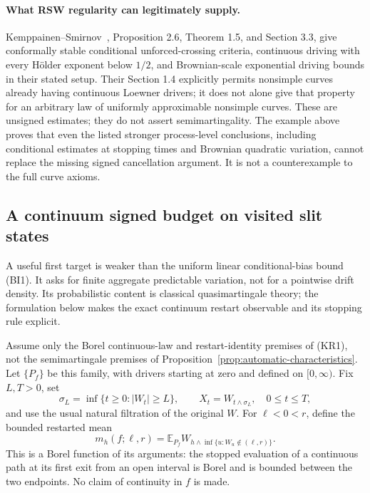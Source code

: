 \documentclass[11pt]{article}
\theoremstyle{definition}\newtheorem{definition}[theorem]{Definition}
\theoremstyle{remark}\newtheorem{remark}[theorem]{Remark}
\begin{document}
\paragraph{What RSW regularity can legitimately supply.}
Kemppainen--Smirnov~\cite{ks}, Proposition 2.6, Theorem 1.5,
and Section 3.3, give conformally stable conditional unforced-crossing
criteria, continuous driving with every H\"older exponent below $1/2$,
and Brownian-scale exponential driving bounds in their stated setup.
Their Section 1.4 explicitly permits nonsimple curves already having
continuous Loewner drivers; it does not alone give that property for an
arbitrary law of uniformly approximable nonsimple curves. These are
unsigned estimates; they do not assert semimartingality.
The example above proves that even the listed stronger process-level
conclusions, including conditional estimates at stopping times and
Brownian quadratic variation, cannot replace the missing signed
cancellation argument. It is not a counterexample to the full curve axioms.

\subsection{A continuum signed budget on visited slit states}
\label{sec:continuum-signed-budget}

A useful first target is weaker than the uniform linear conditional-bias
bound (BI1). It asks for finite aggregate predictable variation, not for a
pointwise drift density. Its probabilistic content is classical
quasimartingale theory; the formulation below makes the exact continuum
restart observable and its stopping rule explicit.

Assume only the Borel continuous-law and restart-identity premises of
(KR1), not the semimartingale premises of Proposition~\ref{prop:automatic-characteristics}.
Let $\{P_f\}$ be this family, with drivers
starting at zero and defined on $[0,\infty)$. Fix $L,T>0$, set
\[
 \sigma_L=\inf\{t\ge0:|W_t|\ge L\},\qquad
 X_t=W_{t\wedge\sigma_L},\quad 0\le t\le T,
 \tag{QV1}
\]
and use the usual natural filtration of the original $W$.
For $\ell<0<r$, define the bounded restarted mean
\[
 m_h(f;\ell,r)=\mathbb E_{P_f}
   W_{h\wedge\inf\{u:W_u\notin(\ell,r)\}}.
 \tag{QV2}
\]
This is a Borel function of its arguments: the stopped evaluation of a
continuous path at its first exit from an open interval is Borel and is
bounded between the two endpoints. No claim of continuity in $f$ is made.
\end{document}
